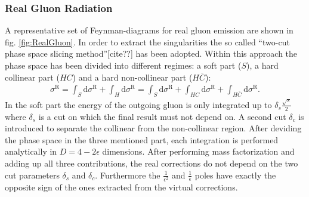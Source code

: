\subsubsection*{Real Gluon Radiation}
A representative set of Feynman-diagrams for real gluon emission are shown in fig. \ref{fig:RealGluon}. In order to extract the singularities the so called ``two-cut phase space slicing method''[cite??] has been adopted. Within this approach the phase space has been divided into different regimes: a soft part ($S$), a hard collinear part ($HC$) and a hard non-collinear part ($H\overline{C}$):
\begin{align}
\sigma^{\mathrm{R}} = \int_S \mathrm{d}\sigma^{\mathrm{R}} + \int_H \mathrm{d}\sigma^{\mathrm{R}} = \int_S \mathrm{d}\sigma^{\mathrm{R}} + \int_{HC} \mathrm{d}\sigma^{\mathrm{R}} + \int_{H\overline{C}}\mathrm{d} \sigma^{\mathrm{R}}.
\end{align}
In the soft part the energy of the outgoing gluon is only integrated up to  $\delta_s \frac{\sqrt{s}}{2}$ where $\delta_s$ is a cut on which the final result must not depend on. A second cut $\delta_c$ is introduced to separate the collinear from the non-collinear region. After deviding the phase space in the three mentioned part, each integration is performed analytically in $D = 4 - 2\epsilon$ dimensions. After performing mass factorization and adding up all three contributions, the real corrections do not depend on the two cut parameters $\delta_s$ and $\delta_c$. Furthermore the $\frac{1}{\epsilon^2}$ and $\frac{1}{\epsilon}$ poles have exactly the opposite sign of the ones extracted from the virtual corrections.



